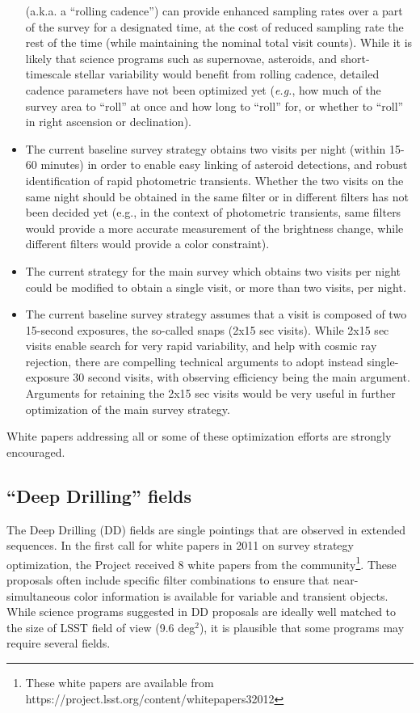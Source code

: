 \documentclass[DM,lsstdraft,toc,usenatbib]{lsstdoc}
\begin{document}
\begin{itemize}
(a.k.a. a ``rolling cadence'') can provide enhanced
sampling rates over a part of the survey for a designated time, at the
cost of reduced sampling rate the rest of the time (while maintaining the nominal total 
visit counts). While it is likely that science programs such as supernovae, asteroids, and
short-timescale stellar variability would benefit from rolling cadence, detailed cadence
parameters have not been optimized yet ({\it e.g.}, how much of the survey area to ``roll'' at once 
and how long to ``roll'' for, or whether to ``roll'' in right ascension or declination). 
\item The current baseline survey strategy obtains two visits per night (within 15-60 minutes) in 
order to enable easy linking of asteroid detections, and robust identification of rapid 
photometric transients. Whether the two visits on the same night should be obtained 
in the same filter or in different filters has not been decided yet (e.g., in the context
of photometric transients, same filters would provide a more accurate measurement
of the brightness change, while different filters would provide a color constraint). 
\item The current strategy for the main survey which obtains two visits per night could be 
modified to obtain a single visit, or more than two visits, per night. 
\item The current baseline survey strategy assumes that a visit is composed of two 15-second
exposures, the so-called snaps (2x15 sec visits). While 2x15 sec visits enable search for very rapid variability,
and help with cosmic ray rejection, there are compelling technical arguments to adopt instead
single-exposure 30 second visits, with observing efficiency being the main argument. Arguments for 
retaining the 2x15 sec visits would be very useful in further optimization of the main survey strategy. 
\end{itemize}
White papers addressing all or some of these optimization efforts are strongly encouraged.


\subsection{``Deep Drilling'' fields} 

The Deep Drilling (DD) fields are single pointings that are observed in extended sequences. 
In the first call for white papers in 2011 on survey strategy optimization, the Project received 
8 white papers from the community\footnote{These white papers are available from 
https://project.lsst.org/content/whitepapers32012}. These proposals often include specific 
filter combinations to ensure that near-simultaneous color information is available for 
variable and transient objects. While science programs suggested in DD proposals are ideally well 
matched to the size of LSST field of view (9.6 deg$^2$), it is plausible that some
programs may require several fields. 
\end{document}
